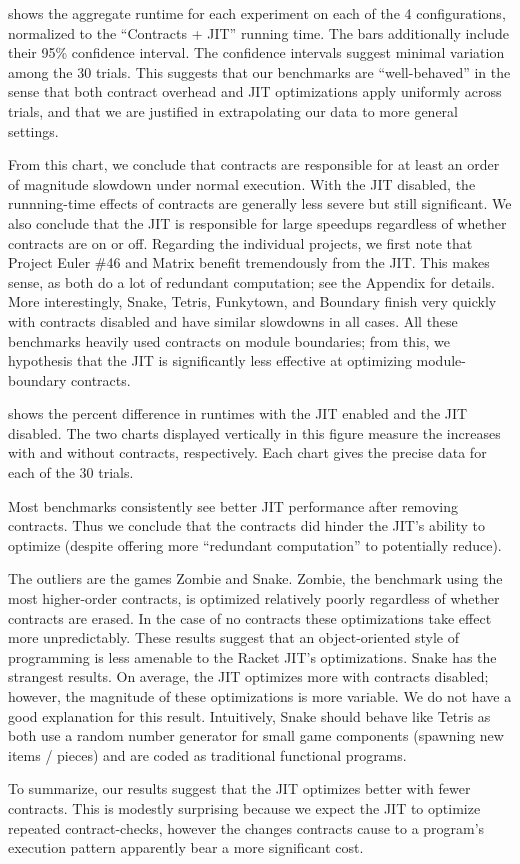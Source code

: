 

 shows the aggregate runtime for each experiment on each of the 4 configurations, normalized to the ``Contracts + JIT'' running time.
The bars additionally include their 95\% confidence interval.
The confidence intervals suggest minimal variation among the 30 trials.
This suggests that our benchmarks are ``well-behaved'' in the sense that both contract overhead and JIT optimizations apply uniformly across trials, and that we are justified in extrapolating our data to more general settings.

From this chart, we conclude that contracts are responsible for at least an order of magnitude slowdown under normal execution.
With the JIT disabled, the runnning-time effects of contracts are generally less severe but still significant.
We also conclude that the JIT is responsible for large speedups regardless of whether contracts are on or off.
Regarding the individual projects, we first note that Project Euler \#46 and Matrix benefit tremendously from the JIT.
This makes sense, as both do a lot of redundant computation; see the Appendix for details.
More interestingly, Snake, Tetris, Funkytown, and Boundary finish very quickly with contracts disabled and have similar slowdowns in all cases.
All these benchmarks heavily used contracts on module boundaries; from this, we hypothesis that the JIT is significantly less effective at optimizing module-boundary contracts.

\newpage


 shows the percent difference in runtimes with the JIT enabled and the JIT disabled.
The two charts displayed vertically in this figure measure the increases with and without contracts, respectively.
Each chart gives the precise data for each of the 30 trials.

Most benchmarks consistently see better JIT performance after removing contracts.
Thus we conclude that the contracts did hinder the JIT's ability to optimize (despite offering more ``redundant computation'' to potentially reduce).

The outliers are the games Zombie and Snake.
Zombie, the benchmark using the most higher-order contracts, is optimized relatively poorly regardless of whether contracts are erased.
In the case of no contracts these optimizations take effect more unpredictably.
These results suggest that an object-oriented style of programming is less amenable to the Racket JIT's optimizations.
Snake has the strangest results.
On average, the JIT optimizes more with contracts disabled; however, the magnitude of these optimizations is more variable.
We do not have a good explanation for this result.
Intuitively, Snake should behave like Tetris as both use a random number generator for small game components (spawning new items / pieces) and are coded as traditional functional programs.

To summarize, our results suggest that the JIT optimizes better with fewer contracts.
This is modestly surprising because we expect the JIT to optimize repeated contract-checks, however the changes contracts cause to a program's execution pattern apparently bear a more significant cost.

